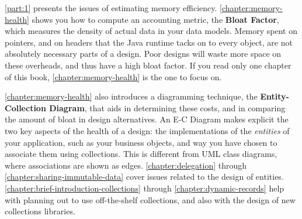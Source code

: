 \autoref{part:1} presents the issues of estimating memory efficiency.
\autoref{chapter:memory-health} shows you how to compute an accounting metric,
the \textbf{Bloat Factor}, which measures the density of actual data in your
data models. Memory spent on pointers, and on headers that the Java runtime
tacks on to every object, are not absolutely necessary parts of a design. Poor
designs will waste more space on these overheads, and thus have a high bloat
factor. If you read only one chapter of this book,
\autoref{chapter:memory-health} is the one to focus on.

\autoref{chapter:memory-health} also introduces a diagramming technique, the
\textbf{Entity-Collection Diagram}, that aids in determining these costs, and in
comparing the amount of bloat in design alternatives.
An E-C Diagram makes explicit the two key aspects of the health of a design:
the implementations of the \emph{entities} of your application, such as your
business objects, and way you have chosen to associate them using collections.
This is different from UML class diagrams, where associations are shown as
edges.
\autoref{chapter:delegation} through
\autoref{chapter:sharing-immutable-data} cover issues related to the design of
entities.
\autoref{chapter:brief-introduction-collections} through
\autoref{chapter:dynamic-records} help with planning out to use off-the-shelf
collections, and also with the design of new collections libraries.


\begin{comment}
[NMM 20120628 too much E-C diagram detail for intro?]
A data model implementation begins with a conceptual understanding of the
entities and relationships in the model.  This may be an informal understanding,
or it may be formalized in a diagram such as an E-R diagram or a UML class
diagram.  At some point that conceptual model is turned into Java classes that
represent the entities, attributes, and assocations of the model, as well as any
auxiliary structures, such as indexes, needed to access the data.  The example
below shows a simple conceptual model, using a UML class diagram.  A Java
implementation of that model is also shown, using rectangles for classes and
arrows for references.  %
in that it shows
\end{comment}

